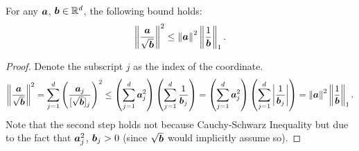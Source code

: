 \begin{lemma}
\label{lemma:var_term_trick}
For any $\boldsymbol{a}$, $\boldsymbol{b}\in\mathbb{R}^d$, the following bound holds:
\begin{align*}
    \left\| \frac{\boldsymbol{a}}{\sqrt{\boldsymbol{b}}} \right\|^2 \leq \left\| \boldsymbol{a}\right\|^2\left\| \frac{1}{\boldsymbol{b}}\right\|_1.
\end{align*}
\end{lemma}
\begin{proof}
Denote the subscript $j$ as the index of the coordinate.
\begin{align*}
    \left\| \frac{\boldsymbol{a}}{\sqrt{\boldsymbol{b}}} \right\|^2 =  \sum_{j=1}^{d} \left( \frac{\boldsymbol{a}_j}{[\sqrt{\boldsymbol{b}}]_j} \right)^2 \leq \left( \sum_{j=1}^{d}\boldsymbol{a}_j^2 \right)\left( \sum_{j=1}^{d}\frac{1}{\boldsymbol{b}_j} \right) = \left( \sum_{j=1}^{d}\boldsymbol{a}_j^2 \right)\left( \sum_{j=1}^{d}\left|\frac{1}{\boldsymbol{b}_j}\right| \right) = \left\| \boldsymbol{a}\right\|^2\left\| \frac{1}{\boldsymbol{b}}\right\|_1.
\end{align*}
Note that the second step holds not because Cauchy-Schwarz Inequality but due to the fact that $\boldsymbol{a}_j^2$, $\boldsymbol{b}_j>0$ (since $\sqrt{\boldsymbol{b}}$ would implicitly assume so).
\end{proof}

